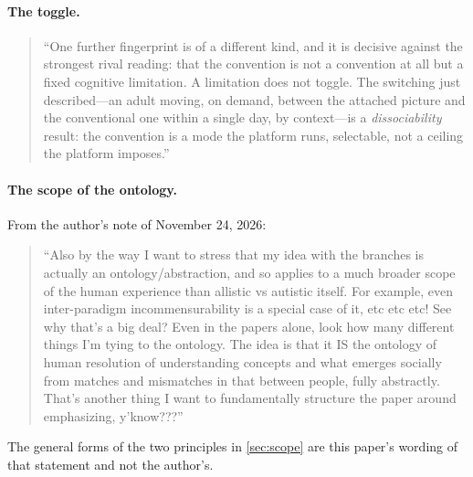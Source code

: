 \paragraph{The toggle.}
\begin{quote}
``One further fingerprint is of a different kind, and it is decisive against the strongest rival reading: that the convention is not a convention at all but a fixed cognitive limitation. A limitation does not toggle. The switching just described---an adult moving, on demand, between the attached picture and the conventional one within a single day, by context---is a \emph{dissociability} result: the convention is a mode the platform runs, selectable, not a ceiling the platform imposes.''
\end{quote}

\paragraph{The scope of the ontology.} From the author's note of November 24, 2026:
\begin{quote}
``Also by the way I want to stress that my idea with the branches is actually an ontology/abstraction, and so applies to a much broader scope of the human experience than allistic vs autistic itself. For example, even inter-paradigm incommensurability is a special case of it, etc etc etc! See why that's a big deal? Even in the papers alone, look how many different things I'm tying to the ontology. The idea is that it IS the ontology of human resolution of understanding concepts and what emerges socially from matches and mismatches in that between people, fully abstractly. That's another thing I want to fundamentally structure the paper around emphasizing, y'know???''
\end{quote}
The general forms of the two principles in \autoref{sec:scope} are this paper's wording of that statement and not the author's.


